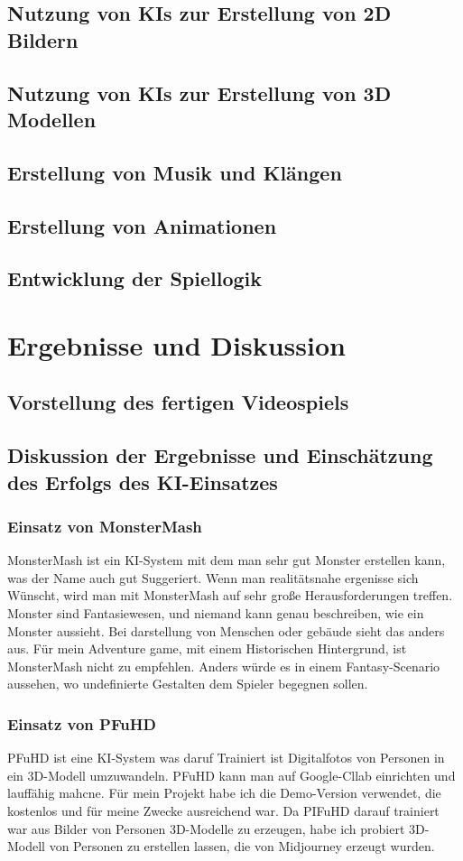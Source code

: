 \documentclass[12pt,a4paper,bibliography=totocnumbered,listof=totocnumbered]{scrartcl}
\begin{document}
\subsection{Nutzung von KIs zur Erstellung von 2D Bildern}
\subsection{Nutzung von KIs zur Erstellung von 3D Modellen}
\subsection{Erstellung von Musik und Klängen}
\subsection{Erstellung von Animationen}
\subsection{Entwicklung der Spiellogik}

\section{Ergebnisse und Diskussion}
\subsection{Vorstellung des fertigen Videospiels}
\subsection{Diskussion der Ergebnisse und Einschätzung des Erfolgs des KI-Einsatzes}
\subsubsection{Einsatz von MonsterMash}
	MonsterMash ist ein KI-System mit dem man sehr gut Monster erstellen kann, was der Name auch gut Suggeriert. Wenn man realitätsnahe ergenisse sich Wünscht, wird man mit MonsterMash auf sehr große Herausforderungen treffen. Monster sind Fantasiewesen, und niemand kann genau beschreiben, wie ein Monster aussieht. Bei darstellung von Menschen oder gebäude sieht das anders aus. Für mein Adventure game, mit einem Historischen Hintergrund, ist MonsterMash nicht zu empfehlen. Anders würde es in einem Fantasy-Scenario aussehen, wo undefinierte Gestalten dem Spieler begegnen sollen.
\subsubsection{Einsatz von PFuHD}
PFuHD ist eine KI-System was daruf Trainiert ist Digitalfotos von Personen in ein 3D-Modell umzuwandeln. PFuHD kann man auf Google-Cllab einrichten und lauffähig mahcne. Für mein Projekt habe ich die Demo-Version verwendet, die kostenlos und für meine Zwecke ausreichend war.
Da PIFuHD darauf trainiert war aus Bilder von Personen 3D-Modelle zu erzeugen, habe ich probiert 3D-Modell von Personen zu erstellen lassen, die von Midjourney erzeugt wurden.
\end{document}

